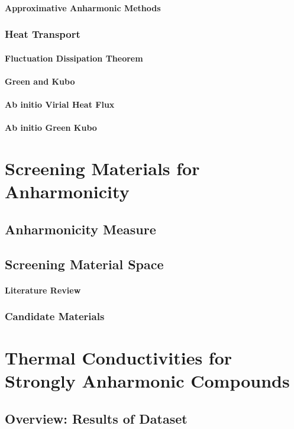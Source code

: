 \documentclass[a4paper,12pt]{book}
\begin{document}
\subsubsection{Approximative Anharmonic Methods}

\subsection{Heat Transport}
\subsubsection{Fluctuation Dissipation Theorem}
\subsubsection{Green and Kubo}
\subsubsection{Ab initio Virial Heat Flux}
\subsubsection{Ab initio Green Kubo}

\chapter{Screening Materials for Anharmonicity}
\section{Anharmonicity Measure}
\section{Screening Material Space}
\subsubsection{Literature Review}
\subsection{Candidate Materials}

\chapter{Thermal Conductivities for Strongly Anharmonic Compounds}
\section{Overview: Results of Dataset}
\end{document}
